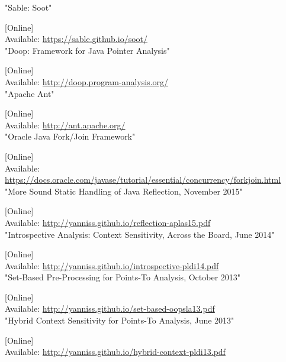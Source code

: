 \documentclass{dithesis}
\begin{document}
\begin{thesisbibliography}[References]{99}
        "Sable: Soot"

        [Online] \\ Available: \url{https://sable.github.io/soot/} \\
		"Doop: Framework for Java Pointer Analysis"

        [Online] \\ Available: \url{http://doop.program-analysis.org/} \\
		"Apache Ant"

        [Online] \\ Available: \url{http://ant.apache.org/} \\
        "Oracle Java Fork/Join Framework"

        [Online] \\ Available: \url{https://docs.oracle.com/javase/tutorial/essential/concurrency/forkjoin.html} \\
        "More Sound Static Handling of Java Reflection, November 2015"

        [Online] \\ Available: \url{http://yanniss.github.io/reflection-aplas15.pdf} \\
        "Introspective Analysis: Context Sensitivity, Across the Board, June 2014"

        [Online] \\ Available: \url{http://yanniss.github.io/introspective-pldi14.pdf} \\
        "Set-Based Pre-Processing for Points-To Analysis, October 2013"

        [Online] \\ Available: \url{http://yanniss.github.io/set-based-oopsla13.pdf} \\
        "Hybrid Context Sensitivity for Points-To Analysis, June 2013"

        [Online] \\ Available: \url{http://yanniss.github.io/hybrid-context-pldi13.pdf} \\
\end{thesisbibliography}
\end{document}
